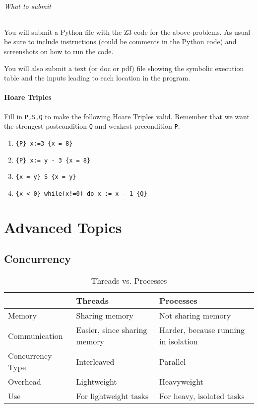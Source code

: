 \documentclass[oneside,11pt,dvipsnames]{book}
\newcommand{\code}[1]{\texttt{#1}}
\begin{document}
\paragraph{What to submit} You will submit a Python file with the Z3 code for the above problems. As usual be sure to include instructions (could be comments in the Python code) and screenshots on how to run the code.

You will also submit a text (or doc or pdf) file showing the symbolic execution table and the inputs leading to each location in the program.


\subsection{Hoare Triples}\label{exercise:hoare-tripples}

Fill in \texttt{P,S,Q} to make the following Hoare Triples valid. Remember that we want the strongest postcondition \code{Q} and weakest precondition \code{P}.

\begin{enumerate}
\def\labelenumi{\arabic{enumi}.}
\item
  \texttt{\{P\}\ x:=3\ \{x\ =\ 8\}}
\item
  \texttt{\{P\}\ x:=\ y\ -\ 3\ \{x\ =\ 8\}}
\item
  \texttt{\{x\ =\ y\}\ S\ \{x\ =\ y\}}
\item
  \texttt{\{x\ \textless{}\ 0\}\ while(x!=0)\ do\ x\ :=\ x\ -\ 1\ \{Q\}}
\end{enumerate}

\part{Advanced Topics}
\chapter{Concurrency}\label{chap:concurrency}


\begin{table}
    \caption{Threads vs. Processes}\label{tab:threads-vs-processes}
    \small
    \centering
    \begin{tabular}{l|l|l}
    \toprule
    &\textbf{Threads} & \textbf{Processes} \\
    \midrule
    Memory & Sharing memory & Not sharing memory\\
    Communication & Easier, since sharing memory & Harder, because running in isolation \\
    Concurrency Type & Interleaved & Parallel \\
    Overhead & Lightweight & Heavyweight\\
    Use & For lightweight tasks & For heavy, isolated tasks \\
    \bottomrule
    \end{tabular}
\end{table}
\end{document}
